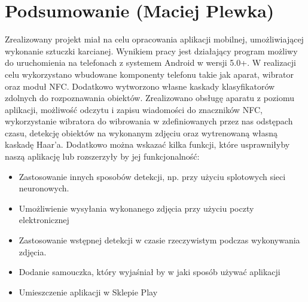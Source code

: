 \section{Podsumowanie (Maciej Plewka)}
Zrealizowany projekt miał na celu opracowania aplikacji mobilnej, umożliwiającej wykonanie sztuczki karcianej. Wynikiem pracy jest działający program możliwy do uruchomienia na telefonach z systemem Android w wersji 5.0+. W realizacji celu wykorzystano wbudowane komponenty telefonu takie jak aparat, wibrator oraz moduł NFC. Dodatkowo wytworzono własne kaskady klasyfikatorów zdolnych do rozpoznawania obiektów. Zrealizowano obsługę aparatu z poziomu aplikacji, możliwość odczytu i zapisu wiadomości do znaczników NFC, wykorzystanie wibratora do wibrowania w zdefiniowanych przez nas odstępach czasu, detekcję obiektów na wykonanym zdjęciu oraz wytrenowaną własną kaskadę Haar'a.
Dodatkowo można wskazać kilka funkcji, które usprawniłyby naszą aplikację lub rozszerzyły by jej funkcjonalność:
\begin{itemize}
    \item Zastosowanie innych sposobów detekcji, np. przy użyciu splotowych sieci neuronowych.
    \item Umożliwienie wysyłania wykonanego zdjęcia przy użyciu poczty elektronicznej
    \item Zastosowanie wstępnej detekcji w czasie rzeczywistym podczas wykonywania zdjęcia.
    \item Dodanie samouczka, który wyjaśniał by w jaki sposób używać aplikacji
    \item Umieszczenie aplikacji w Sklepie Play
\end{itemize}
